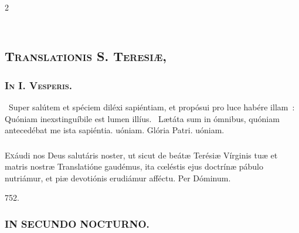 \documentclass[9pt,twoside]{extarticle}
\begin{document}
\begin{multicols}{2}
{{\subsection*{\center \textsc{\\
Translationis S. Teresiæ,}}
\subsubsection*{\center {}}

\begin{tightlist}{}
\item {}
\end{tightlist}
\subsubsection*{\center \textsc{In I. Vesperis.}}
\begin{tightlist}{}
\item {}~Super salútem et spéciem diléxi sapiéntiam, et propósui pro luce habére illam~: \textred{*} Quóniam inexstinguíbile est lumen illíus. ~Lætáta sum in ómnibus, quóniam antecedébat me ista sapiéntia. uóniam. Glória Patri. uóniam.
\end{tightlist}

\subsubsection*{\center {}}
\lettrine{E}xáudi nos Deus salutáris noster, ut sicut de beátæ Terésiæ Vírginis tuæ et matris nostræ Translatióne gaudémus, ita cœléstis ejus doctrínæ pábulo nutriámur, et piæ devotiónis erudiámur afféctu. Per Dóminum.

\begin{tightlist}{}
\item {} 752.
\item {}
\end{tightlist}

\subsubsection*{\center \textsc{IN SECUNDO NOCTURNO.}}
}}
\end{multicols}
\end{document}
